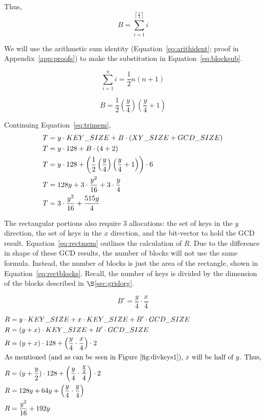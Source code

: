 \documentclass[12pt]{ucthesis}
\begin{document}
\noindent Thus,
\begin{equation}
   B = \sum_{i=1}^{\left\lceil \frac{y}{4} \right\rceil}i
   \label{eq:blocksy}
\end{equation}

\noindent We will use the arithmetic sum identity
(Equation~\ref{eq:arithident}; proof in Appendix~\ref{app:proofs}) to make the
substitution in Equation~\ref{eq:blocksub}.  

\begin{equation}
   \sum_{i=1}^{n}i = \frac{1}{2}n\left(n+1\right)
   \label{eq:arithident}
\end{equation}

\begin{equation}
   B = \frac{1}{2}\left(\frac{y}{4}\right) \left(\frac{y}{4}+1\right)
   \label{eq:blocksub}
\end{equation}

\noindent Continuing Equation~\ref{eq:trimem},
\begin{align}
   T & = y \cdot KEY\_SIZE + B \cdot (XY\_SIZE + GCD\_SIZE)\notag\\
   T & = y \cdot 128 + B \cdot (4 + 2)\notag\\
   T & = y \cdot 128 + \left(\frac{1}{2}\left(\frac{y}{4}\right)\left(\frac{y}{4}+1\right)\right) \cdot 6\notag\\
   T & = 128 y + 3 \cdot \frac{y^2}{16} + 3 \cdot \frac{y}{4}\notag\\
   T & = 3 \cdot \frac{y^2}{16} + \frac{515y}{4}
   \label{eq:trimemcomplete}
\end{align}

The rectangular portions also require 3 allocations: the set of keys in the $y$
direction, the set of keys in the $x$ direction, and the bit-vector to hold the
GCD result. Equation~\ref{eq:rectmem} outlines the calculation of $R$. Due to
the difference in shape of these GCD results, the number of blocks will not use
the same formula. Instead, the number of blocks is just the area of the
rectangle, shown in Equation~\ref{eq:rectblocks}. Recall, the number of keys is
divided by the dimension of the blocks described in $\S$\ref{sec:gridorg}.

\begin{equation}
   B' = \frac{y}{4} \cdot \frac{x}{4}
   \label{eq:rectblocks}
\end{equation}

\begin{align}
   R & = y \cdot KEY\_SIZE + x \cdot KEY\_SIZE + B' \cdot GCD\_SIZE\\
   R & = (y + x) \cdot KEY\_SIZE + B' \cdot GCD\_SIZE\notag\\
   R & = (y + x) \cdot 128 + \left(\frac{y}{4} \cdot \frac{x}{4}\right) \cdot 2\notag\\
   \intertext{As mentioned (and as can be seen in Figure~\ref{fig:divkeys1}), $x$ will be half of $y$. Thus,}
   R & = (y + \frac{y}{2}) \cdot 128 + \left(\frac{y}{4} \cdot \frac{\frac{y}{2}}{4}\right) \cdot 2\notag\\
   R & = 128y + 64y + \left(\frac{y}{4} \cdot \frac{y}{4}\right)\notag\\
   R & = \frac{y^2}{16} + 192y
   \label{eq:rectmem}
\end{align}
\end{document}
